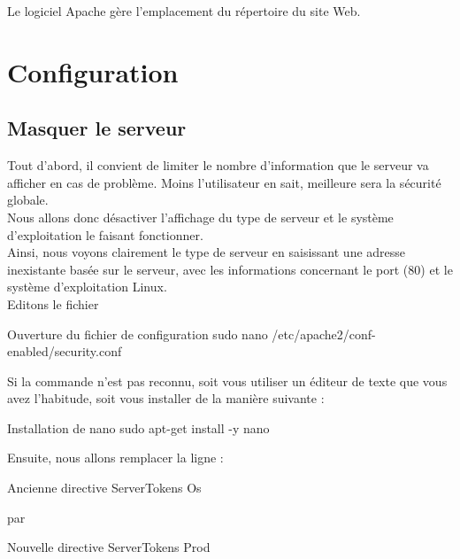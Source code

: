 Le logiciel Apache gère l’emplacement du répertoire du site Web. \\



\chapter{Configuration}


\section{Masquer le serveur}

Tout d’abord, il convient de limiter le nombre d’information que le serveur va afficher en cas de problème. Moins l’utilisateur en sait, meilleure sera la sécurité globale.\\

Nous allons donc désactiver l’affichage du type de serveur et le système d’exploitation le faisant fonctionner.\\

Ainsi, nous voyons clairement le type de serveur en saisissant une adresse inexistante basée sur le serveur, avec les informations concernant le port (80) et le système d’exploitation Linux. \\

Editons le fichier 

\begin{Bash}{Ouverture du fichier de configuration}
sudo nano /etc/apache2/conf-enabled/security.conf 
\end{Bash}

Si la commande  n'est pas reconnu, soit vous utiliser un éditeur de texte que vous avez l'habitude, soit vous installer  de la manière suivante : 

\begin{Bash}{Installation de nano}
sudo apt-get install -y nano
\end{Bash}


Ensuite, nous allons remplacer la ligne :
\begin{Bash}{Ancienne directive}
ServerTokens Os 
\end{Bash}
par
\begin{Bash}{Nouvelle directive}
ServerTokens Prod 
\end{Bash}

